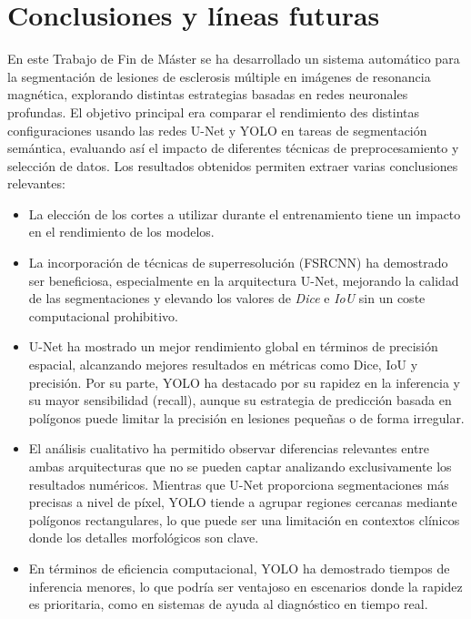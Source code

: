 \documentclass[../main.tex]{subfiles}
\begin{document}
\section{Conclusiones y líneas futuras}

En este Trabajo de Fin de Máster se ha desarrollado un sistema automático para la segmentación de lesiones de esclerosis múltiple en imágenes de resonancia magnética, explorando distintas estrategias basadas en redes neuronales profundas. El objetivo principal era comparar el rendimiento des distintas configuraciones usando las redes U-Net y YOLO en tareas de segmentación semántica, evaluando así el impacto de diferentes técnicas de preprocesamiento y selección de datos. Los resultados obtenidos permiten extraer varias conclusiones relevantes:

\begin{itemize}
    \item La elección de los cortes a utilizar durante el entrenamiento tiene un impacto en el rendimiento de los modelos. %
    
    \item La incorporación de técnicas de superresolución (FSRCNN) ha demostrado ser beneficiosa, especialmente en la arquitectura U-Net, mejorando la calidad de las segmentaciones y elevando los valores de \textit{Dice} e \textit{IoU} sin un coste computacional prohibitivo.

    \item U-Net ha mostrado un mejor rendimiento global en términos de precisión espacial, alcanzando mejores resultados en métricas como Dice, IoU y precisión. Por su parte, YOLO ha destacado por su rapidez en la inferencia y su mayor sensibilidad (recall), aunque su estrategia de predicción basada en polígonos puede limitar la precisión en lesiones pequeñas o de forma irregular.

    \item El análisis cualitativo ha permitido observar diferencias relevantes entre ambas arquitecturas que no se pueden captar analizando exclusivamente los resultados numéricos. Mientras que U-Net proporciona segmentaciones más precisas a nivel de píxel, YOLO tiende a agrupar regiones cercanas mediante polígonos rectangulares, lo que puede ser una limitación en contextos clínicos donde los detalles morfológicos son clave.

    \item En términos de eficiencia computacional, YOLO ha demostrado tiempos de inferencia menores, lo que podría ser ventajoso en escenarios donde la rapidez es prioritaria, como en sistemas de ayuda al diagnóstico en tiempo real.
\end{itemize}
\end{document}
